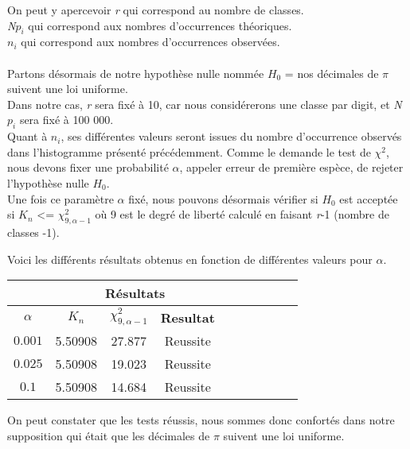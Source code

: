 \documentclass[french]{article}
\begin{document}
On peut y apercevoir \textit{r} qui correspond au nombre de classes. \\
\textit{N$p_{i}$} qui correspond aux nombres d'occurrences théoriques. \\
\textit{$n_{i}$} qui correspond aux nombres d'occurrences observées.
\\
\\
Partons désormais de notre hypothèse nulle nommée $H_{0}$ = {nos décimales de $\pi$ suivent une loi uniforme}.
\\
Dans notre cas, \textit{r} sera fixé à 10, car nous considérerons une classe par digit, et \textit{N$p_{i}$} sera fixé à 100 000.\\ 
Quant à \textit{$n_{i}$}, ses différentes valeurs seront issues du nombre d'occurrence observés dans l'histogramme présenté précédemment.
Comme le demande le test de \textbf{$\chi^{2}$}, nous devons fixer une probabilité $\alpha$, appeler erreur de première espèce, de rejeter l'hypothèse nulle $H_{0}$.
\\
Une fois ce paramètre $\alpha$ fixé, nous pouvons désormais vérifier si $H_{0}$ est acceptée
si $K_{n}$ <= $\chi^{2}_{9,\alpha-1}$ où 9 est le degré de liberté calculé en faisant \textit{r}-1 (nombre de classes -1).

Voici les différents résultats obtenus en fonction de différentes valeurs pour $\alpha$.
\\
\begin{longtable}{|c|c|c|c|c|c|c|c|c|c|}
	\hline
	& \multicolumn{3}{c|}{\textbf{Résultats}} \\ 
	\hline 
	\textbf{$\alpha$}  & $K_{n}$ & $\chi^{2}_{9,\alpha-1}$ & \textbf{Resultat} \\ 
	\hline 
	$$0.001$$ & 5.50908 & 27.877 & Reussite\\ 
	\hline 
	$$0.025$$ & 5.50908 & 19.023 & Reussite\\ 
	\hline 
	$$0.1$$ & 5.50908 & 14.684 & Reussite \\ 
	\hline 
\end{longtable}

On peut constater que les tests réussis, nous sommes donc confortés dans notre supposition qui était que les décimales de $\pi$ suivent une loi uniforme.
\\
\end{document}
